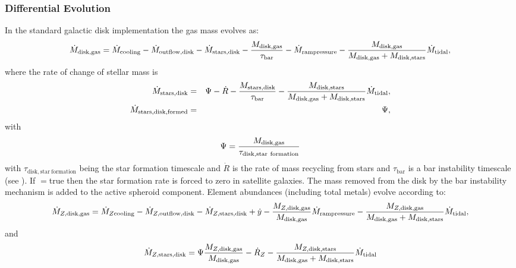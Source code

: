 \subsubsection{Differential Evolution}

In the standard galactic disk implementation the gas mass evolves as:
\begin{equation}
 \dot{M}_\mathrm{disk, gas} = \dot{M}_\mathrm{cooling} - \dot{M}_\mathrm{outflow, disk} - \dot{M}_\mathrm{stars, disk} - {M_\mathrm{disk, gas}\over \tau_\mathrm{bar}} - \dot{M}_\mathrm{ram pressure} - {M_\mathrm{disk, gas} \over M_\mathrm{disk, gas} + M_\mathrm{disk, stars}} \dot{M}_\mathrm{tidal},
\end{equation}
where the rate of change of stellar mass is
\begin{eqnarray}
  \dot{M}_\mathrm{stars, disk} &=& \Psi - \dot{R} - {M_\mathrm{stars,disk} \over \tau_\mathrm{bar}} - {M_\mathrm{disk, stars} \over M_\mathrm{disk, gas} + M_\mathrm{disk, stars}} \dot{M}_\mathrm{tidal}, \\
  \dot{M}_\mathrm{stars, disk, formed } &=& \Psi,
\end{eqnarray}
with
\begin{equation}
 \Psi = {M_\mathrm{disk, gas} \over \tau_\mathrm{disk, star~formation}}
\end{equation}
with $\tau_\mathrm{disk, star~formation}$ being the star formation timescale and $\dot{R}$ is the rate of mass recycling from stars and $\tau_\mathrm{bar}$ is a bar instability timescale (see ). If {\normalfont \ttfamily [diskStarFormationInSatellites]}$=${\normalfont \ttfamily true} then the star formation rate is forced to zero in satellite galaxies. The mass removed from the disk by the bar instability mechanism is added to the active spheroid component.
Element abundances (including total metals) evolve according to:
\begin{equation}
  \dot{M}_{Z, \mathrm{disk, gas}} = \dot{M}_{Z \mathrm{cooling}} - \dot{M}_{Z, \mathrm{outflow, disk}} - \dot{M}_{Z, \mathrm{stars, disk}} + \dot{y} - {M_{Z, \mathrm{disk, gas}} \over M_\mathrm{disk, gas}} \dot{M}_\mathrm{ram pressure} - {M_{Z, \mathrm{disk, gas}} \over M_\mathrm{disk, gas} + M_\mathrm{disk, stars}} \dot{M}_\mathrm{tidal},
\end{equation}
and
\begin{equation}
 \dot{M}_{Z, \mathrm{stars, disk}} = \Psi {M_{Z, \mathrm{disk, gas}} \over M_\mathrm{disk, gas}} - \dot{R}_Z - {M_{Z, \mathrm{disk, stars}} \over M_\mathrm{disk, gas} + M_\mathrm{disk, stars}} \dot{M}_\mathrm{tidal}
\end{equation}
